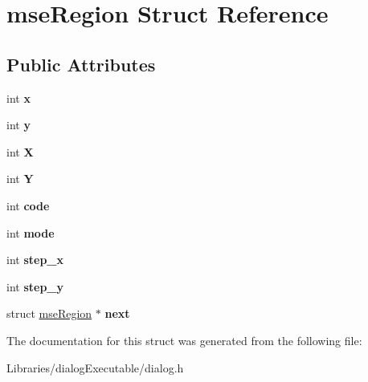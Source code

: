 \hypertarget{structmse_region}{}\section{mse\+Region Struct Reference}
\label{structmse_region}
\subsection*{Public Attributes}
\begin{DoxyCompactItemize}
\item 
int {\bfseries x}\hypertarget{structmse_region_aed0b3fa07d4d277c3cd46f9c7d91d309}{}\label{structmse_region_aed0b3fa07d4d277c3cd46f9c7d91d309}

\item 
int {\bfseries y}\hypertarget{structmse_region_a4fade99496309ac3dd1a8c7d868fe8aa}{}\label{structmse_region_a4fade99496309ac3dd1a8c7d868fe8aa}

\item 
int {\bfseries X}\hypertarget{structmse_region_af36ee0658ce9ec6179d07b84690b0b16}{}\label{structmse_region_af36ee0658ce9ec6179d07b84690b0b16}

\item 
int {\bfseries Y}\hypertarget{structmse_region_a2a49df437b79e706d892e52d0bd98ab7}{}\label{structmse_region_a2a49df437b79e706d892e52d0bd98ab7}

\item 
int {\bfseries code}\hypertarget{structmse_region_a70f9be31b50939a9d46fbceeff38c6dc}{}\label{structmse_region_a70f9be31b50939a9d46fbceeff38c6dc}

\item 
int {\bfseries mode}\hypertarget{structmse_region_a85751de0d02c1c5030f15b49d5e292cc}{}\label{structmse_region_a85751de0d02c1c5030f15b49d5e292cc}

\item 
int {\bfseries step\+\_\+x}\hypertarget{structmse_region_a9e4a8fc32c1dee5fccc438804ac9227d}{}\label{structmse_region_a9e4a8fc32c1dee5fccc438804ac9227d}

\item 
int {\bfseries step\+\_\+y}\hypertarget{structmse_region_a0d3d5b2d9fa55318ff100758a794fc89}{}\label{structmse_region_a0d3d5b2d9fa55318ff100758a794fc89}

\item 
struct \hyperlink{structmse_region}{mse\+Region} $\ast$ {\bfseries next}\hypertarget{structmse_region_a61b2aaf749f306674b96f936339ad8dd}{}\label{structmse_region_a61b2aaf749f306674b96f936339ad8dd}

\end{DoxyCompactItemize}


The documentation for this struct was generated from the following file\+:\begin{DoxyCompactItemize}
\item 
Libraries/dialog\+Executable/dialog.\+h\end{DoxyCompactItemize}
